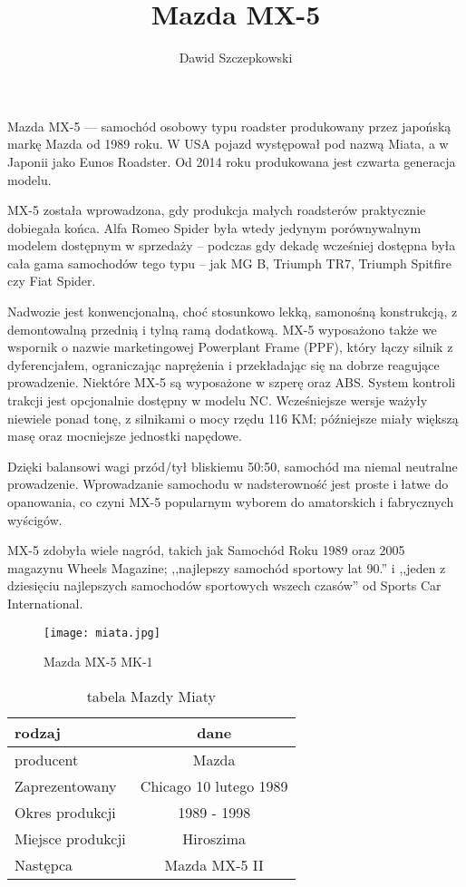 \documentclass[a4paper,12pt]{article}
\title{Mazda MX-5}
\author{Dawid Szczepkowski}
\begin{document}
\maketitle

\begin{abstract}

\end{abstract}
Mazda MX-5 --- samochód osobowy typu roadster produkowany przez japońską markę Mazda od 1989 roku. W USA pojazd występował pod nazwą Miata, a w Japonii jako Eunos Roadster. Od 2014 roku produkowana jest czwarta generacja modelu.

MX-5 została wprowadzona, gdy produkcja małych roadsterów praktycznie dobiegała końca. Alfa Romeo Spider była wtedy jedynym porównywalnym modelem dostępnym w sprzedaży – podczas gdy dekadę wcześniej dostępna była cała gama samochodów tego typu – jak MG B, Triumph TR7, Triumph Spitfire czy Fiat Spider.

Nadwozie jest konwencjonalną, choć stosunkowo lekką, samonośną konstrukcją, z demontowalną przednią i tylną ramą dodatkową. MX-5 wyposażono także we wspornik o nazwie marketingowej Powerplant Frame (PPF), który łączy silnik z dyferencjałem, ograniczając naprężenia i przekładając się na dobrze reagujące prowadzenie. Niektóre MX-5 są wyposażone w szperę oraz ABS. System kontroli trakcji jest opcjonalnie dostępny w modelu NC. Wcześniejsze wersje ważyły niewiele ponad tonę, z silnikami o mocy rzędu 116 KM; późniejsze miały większą masę oraz mocniejsze jednostki napędowe.

Dzięki balansowi wagi przód/tył bliskiemu 50:50, samochód ma niemal neutralne prowadzenie. Wprowadzanie samochodu w nadsterowność jest proste i łatwe do opanowania, co czyni MX-5 popularnym wyborem do amatorskich i fabrycznych wyścigów.

MX-5 zdobyła wiele nagród, takich jak Samochód Roku 1989 oraz 2005 magazynu Wheels Magazine; ,,najlepszy samochód sportowy lat 90.'' i ,,jeden z dziesięciu najlepszych samochodów sportowych wszech czasów'' od Sports Car International.


\begin{figure}
\texttt{[image: miata.jpg]}
\caption{Mazda MX-5 MK-1}\label{fig:Mazda}
\end{figure}


\begin{table}
\begin{tabular}{lc}
\hline
\textbf{rodzaj}&\textbf{dane}\\
\hline
producent&Mazda\\
Zaprezentowany&Chicago 10 lutego 1989\\
Okres produkcji&1989 - 1998\\
Miejsce produkcji&Hiroszima\\
Następca&	Mazda MX-5 II\\
\hline
\end{tabular}
\caption{tabela Mazdy Miaty}
\end{table}


\section{}
\end{document}
